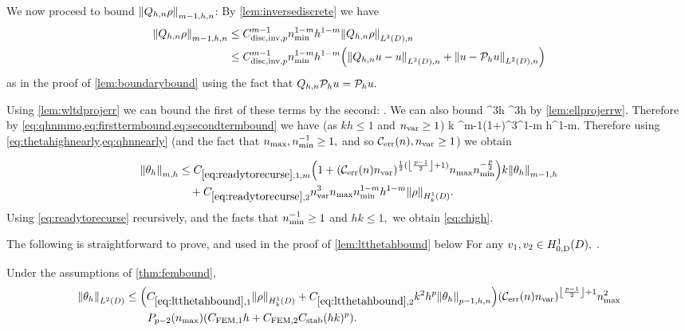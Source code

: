 We now proceed to bound $\Nfn{m-1,h,n}{\Qhn \rho}$: By \cref{lem:inversediscrete} we have
\begin{align}
  \Nfn{m-1,h,n}{\Qhn \rho} &\leq\Chinv^{m-1} \nmin^{1-m}h^{1-m} \NLtDn{\Qhn\rho}\nonumber\\
  &\leq \Chinv^{m-1} \nmin^{1-m}h^{1-m} \mleft(\NLtDn{\Qhn u - u} + \NLtDn{u-\Ph u}\mright)\label{eq:qhnmmo}
\end{align}
as in the proof of \cref{lem:boundarybound} using the fact that $Q_{h,n} \mathcal P_{h} u = \mathcal P_{h} u.$

Using \cref{lem:wltdprojerr} we can bound the first of these terms by the second:
\beq\label{eq:firsttermbound}
 \leq {} \nvar {}.
\eeq
We can also bound
\beq\label{eq:secondtermbound}
 \leq {} \nvar^3h  \leq {} \nvar^3\nmax h \NHokD{\rho}
\eeq
by \cref{lem:ellprojerrw}. Therefore by \cref{eq:qhnmmo,eq:firsttermbound,eq:secondtermbound} we have (as $kh \leq 1$ and $n_{\mathrm{var}} \geq 1$)
\beq\label{eq:qhnnearly}
k  \leq \Chinv^{m-1}\Cwz \mleft(1+\mright)\nvar^3\nmax\nmin^{1-m} h^{1-m}\NHokD{\rho}.
\eeq
Therefore using \cref{eq:thetahighnearly,eq:qhnnearly} (and the fact that $n_{\max}, n_{\min}^{-1} \geq 1,$ and so $\En, \nvar \geq1$)  we obtain

\begin{align}
  \Nfn{m,h}{\thetah} &\leq \CRecofn{m} \mleft(1+\mleft(\En\nvar\mright)^{\half(\floor{\frac{p-1}2}+1)}\nmax\nmin^{-\frac{p}2}\mright)k \Nfn{m-1,h}{\thetah}\nonumber\\
  &\quad+ \CRect \nvar^3\nmax\nmin^{1-m} h^{1-m} \NHokD{\rho}.\label{eq:readytorecurse}
\end{align}
Using \cref{eq:readytorecurse} recursively, and the facts that $n_{\min}^{-1} \geq 1$ and $hk \leq 1,$ we obtain \cref{eq:chigh}.
\epf

The following  is straightforward to prove, and used in the proof of \cref{lem:ltthetahbound} below
\ble[Continuity of $\aT$]\label{lem:continuity}
For any $\vo, \vt \in \HozDD,$
\beqs
\abs{\aT(\vo,\vt)} \leq \Cc \nmax \NHokD{\vo}\NHokD{\vt}.
\eeqs
\ele

\label{lem:ltthetahbound}
Under the assumptions of \cref{thm:fembound},%
\begin{align}
\NLtD{\thetah}&\leq \mleft(\Cfirst\NHokD{\rho} +\Csecond  k^2h^p\Nfn{p-1,h,n}{\thetah}\mright)\mleft(\En \nvar\mright)^{\floor{\frac{p-1}2}+1}\nmax^2\nonumber\\
&\quad\quad\Pfn{p-2}\mleft(\nmax\mright)\mleft(\CFEMotilde h + \CFEMttilde \CAnk (hk)^p\mright).\label{eq:ltthetahbound}
\end{align}
\ele

